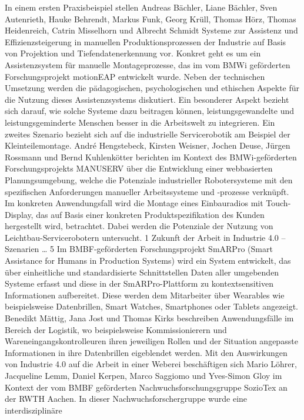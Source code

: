 In einem ersten Praxisbeispiel stellen Andreas Bächler, Liane Bächler, Sven Autenrieth, Hauke Behrendt, Markus Funk, Georg Krüll, Thomas Hörz, Thomas Heidenreich, Catrin Misselhorn und Albrecht Schmidt Systeme zur Assistenz und Effizienzsteigerung in manuellen Produktionsprozessen der Industrie auf Basis von Projektion
und Tiefendatenerkennung vor. Konkret geht es um ein Assistenzsystem für manuelle
Montageprozesse, das im vom BMWi geförderten Forschungsprojekt motionEAP entwickelt wurde. Neben der technischen Umsetzung werden die pädagogischen, psychologischen und ethischen Aspekte für die Nutzung dieses Assistenzsystems diskutiert.
Ein besonderer Aspekt bezieht sich darauf, wie solche Systeme dazu beitragen können,
leistungsgewandelte und leistungsgeminderte Menschen besser in die Arbeitswelt zu
integrieren.
Ein zweites Szenario bezieht sich auf die industrielle Servicerobotik am Beispiel der
Kleinteilemontage. André Hengstebeck, Kirsten Weisner, Jochen Deuse, Jürgen Rossmann
und Bernd Kuhlenkötter berichten im Kontext des BMWi-geförderten Forschungsprojekts
MANUSERV über die Entwicklung einer webbasierten Planungsumgebung, welche die
Potenziale industrieller Robotersysteme mit den spezifischen Anforderungen manueller
Arbeitssysteme und -prozesse verknüpft. Im konkreten Anwendungsfall wird die Montage
eines Einbauradios mit Touch-Display, das auf Basis einer konkreten Produktspezifikation
des Kunden hergestellt wird, betrachtet. Dabei werden die Potenziale der Nutzung von
Leichtbau-Servicerobotern untersucht.
1 Zukunft der Arbeit in Industrie 4.0 – Szenarien … 5
Im BMBF-geförderten Forschungsprojekt SmARPro (Smart Assistance for Humans in
Production Systems) wird ein System entwickelt, das über einheitliche und standardisierte
Schnittstellen Daten aller umgebenden Systeme erfasst und diese in der SmARPro-Plattform zu kontextsensitiven Informationen aufbereitet. Diese werden dem Mitarbeiter über
Wearables wie beispielsweise Datenbrillen, Smart Watches, Smartphones oder Tablets
angezeigt. Benedikt Mättig, Jana Jost und Thomas Kirks beschreiben Anwendungsfälle im
Bereich der Logistik, wo beispielsweise Kommissionierern und Wareneingangskontrolleuren ihren jeweiligen Rollen und der Situation angepasste Informationen in ihre Datenbrillen eigeblendet werden.
Mit den Auswirkungen von Industrie 4.0 auf die Arbeit in einer Weberei beschäftigen
sich Mario Löhrer, Jacqueline Lemm, Daniel Kerpen, Marco Saggiomo und Yves-Simon
Gloy im Kontext der vom BMBF geförderten Nachwuchsforschungsgruppe SozioTex
an der RWTH Aachen. In dieser Nachwuchsforschergruppe wurde eine interdisziplinäre
